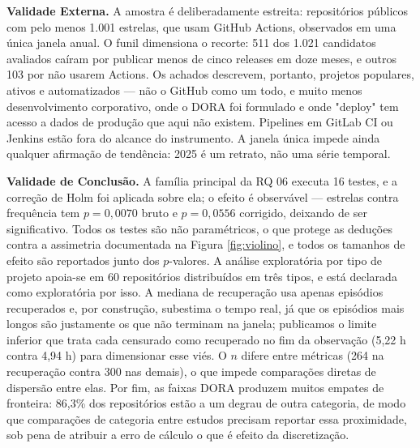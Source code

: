 \textbf{Validade Externa.} A amostra é deliberadamente estreita: repositórios públicos com
pelo menos 1.001 estrelas, que usam GitHub Actions, observados em uma única janela anual. O
funil dimensiona o recorte: 511 dos 1.021 candidatos avaliados caíram por publicar menos de
cinco releases em doze meses, e outros 103 por não usarem Actions. Os achados descrevem,
portanto, projetos populares, ativos e automatizados --- não o GitHub como um todo, e muito
menos desenvolvimento corporativo, onde o DORA foi formulado e onde "deploy" tem acesso a
dados de produção que aqui não existem. Pipelines em GitLab CI ou Jenkins estão fora do
alcance do instrumento. A janela única impede ainda qualquer afirmação de tendência: 2025 é
um retrato, não uma série temporal.

\textbf{Validade de Conclusão.} A família principal da RQ 06 executa 16 testes, e a correção
de Holm foi aplicada sobre ela; o efeito é observável --- estrelas contra frequência tem
$p = 0{,}0070$ bruto e $p = 0{,}0556$ corrigido, deixando de ser significativo. Todos os
testes são não paramétricos, o que protege as deduções contra a assimetria documentada na
Figura \ref{fig:violino}, e todos os tamanhos de efeito são reportados junto dos $p$-valores.
A análise exploratória por tipo de projeto apoia-se em 60 repositórios distribuídos em três
tipos, e está declarada como exploratória por isso. A mediana de recuperação usa apenas
episódios recuperados e, por construção, subestima o tempo real, já que os episódios mais
longos são justamente os que não terminam na janela; publicamos o limite inferior que trata
cada censurado como recuperado no fim da observação (5,22 h contra 4,94 h) para dimensionar
esse viés. O $n$ difere entre métricas (264 na recuperação contra 300 nas demais), o que
impede comparações diretas de dispersão entre elas. Por fim, as faixas DORA produzem muitos
empates de fronteira: 86,3\% dos repositórios estão a um degrau de outra categoria, de modo
que comparações de categoria entre estudos precisam reportar essa proximidade, sob pena de
atribuir a erro de cálculo o que é efeito da discretização.
